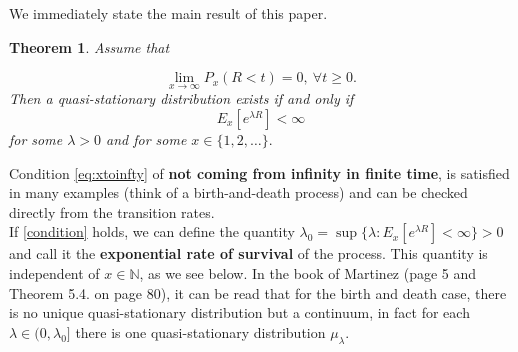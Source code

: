 \documentclass[12pt,a4paper]{scrartcl}
\newtheorem{theorem}{Theorem}[section]
\numberwithin{equation}{section}
\newcommand{\N}{\mathbb{N}} %
\begin{document}
We immediately state the main result of this paper.

\begin{theorem}  \label{maintheorem}
Assume that

\begin{equation} \label{eq:xtoinfty}
\lim_{ x \to \infty} {P_{x}\left(R < t\right)} = 0 , \ \forall t \geq 0.
\end{equation}
Then a quasi-stationary distribution exists if and only if
\begin{equation}
E_{x} \left[e^{\lambda R}\right] < \infty
\label{condition}
\end{equation}
for some $\lambda > 0 $ and for some $ x \in \lbrace 1,2,\ldots \rbrace .$
\end{theorem}

Condition \eqref{eq:xtoinfty} of \textbf{not coming from infinity in finite time}, is satisfied in many examples (think of a birth-and-death process) and can be checked directly from the transition rates.\\
If \eqref{condition} holds, we can define the quantity $\lambda_0 = \sup\lbrace \lambda : E_{x} \left[e^{\lambda R}\right] < \infty \rbrace > 0$ and call it the \textbf{exponential rate of survival} of the process. This quantity is independent of $x \in \N$, as we see below. In the book of Martinez (page 5 and Theorem 5.4. on page 80), it can be read that for the birth and death case, there is no unique quasi-stationary distribution but a continuum, in fact for each $\lambda \in (0,\lambda_0]$ there is one quasi-stationary distribution $\mu_{\lambda}.$
\end{document}
